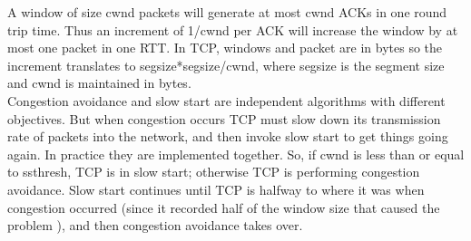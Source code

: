 A window of size cwnd packets will generate at most cwnd ACKs in one round trip time. Thus an increment of 1/cwnd per ACK will increase the window by at most one packet in one RTT. In TCP, windows and packet are in bytes so the increment translates to segsize*segsize/cwnd, where segsize is the segment size and cwnd is maintained in bytes.\\

Congestion avoidance and slow start are independent algorithms with different objectives.  But when congestion occurs TCP must slow down  its transmission rate of packets into the network, and then invoke slow start to get things going again. In practice they are implemented together. So, if cwnd is less than or equal to ssthresh, TCP is in slow start; otherwise TCP is performing congestion avoidance. Slow start continues until TCP is halfway to where it was when congestion occurred (since it recorded half of the window size that caused the problem ), and then congestion avoidance takes over.\\
